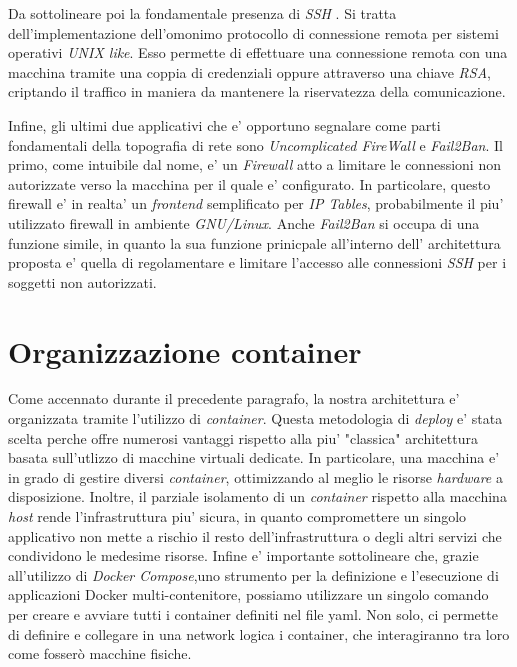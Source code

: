 \documentclass[a4paper]{report}
\begin{document}
		Da sottolineare poi la fondamentale presenza di \emph{SSH} \label{SSH}.  Si tratta dell'implementazione
		dell'omonimo protocollo di connessione remota per sistemi operativi \emph{UNIX like}. Esso permette di
		effettuare una connessione remota con una macchina tramite una coppia di credenziali oppure attraverso una chiave
		\emph{RSA}, criptando il traffico in maniera da mantenere la riservatezza della comunicazione.

		Infine, gli ultimi due applicativi che e' opportuno segnalare come parti fondamentali della topografia di rete
		sono \emph{Uncomplicated FireWall} e \emph{Fail2Ban}. Il primo, come intuibile dal nome, e' un \emph{Firewall}
		atto a limitare le connessioni non autorizzate verso la macchina per il quale e' configurato. In particolare,
		questo firewall e' in realta' un \emph{frontend} semplificato per \emph{IP Tables}, probabilmente il piu'
		utilizzato firewall in ambiente \emph{GNU/Linux}.
		Anche \emph{Fail2Ban} si occupa di una funzione simile, in quanto la sua funzione prinicpale all'interno dell'
		architettura proposta e' quella di regolamentare e limitare l'accesso alle connessioni \emph{SSH} per i soggetti
		non autorizzati.
 
	\section{Organizzazione container} \label{organizzazione_container}
		Come accennato durante il precedente paragrafo, la nostra architettura e' organizzata tramite l'utilizzo di
		\emph{container}. Questa metodologia di  \emph{deploy} e' stata scelta perche offre numerosi vantaggi rispetto
		alla piu' "classica" architettura basata sull'utlizzo di macchine virtuali dedicate. In particolare, una
		macchina e' in grado di gestire diversi \emph{container}, ottimizzando al meglio le risorse
		\emph{hardware} a disposizione. Inoltre, il parziale isolamento di un \emph{container} rispetto alla macchina
		\emph{host} rende l'infrastruttura piu' sicura, in quanto compromettere un singolo applicativo non mette a
		rischio il resto dell'infrastruttura o degli altri servizi che condividono le medesime risorse.
		Infine e' importante sottolineare che, grazie all'utilizzo di \emph{Docker Compose},uno strumento per la 
		definizione e l'esecuzione di applicazioni Docker multi-contenitore, possiamo utilizzare un singolo comando per
		creare e avviare tutti i container definiti nel file yaml. Non solo, ci permette di definire e collegare in una
		network logica i container, che interagiranno tra loro come fosserò macchine fisiche. 
\end{document}
